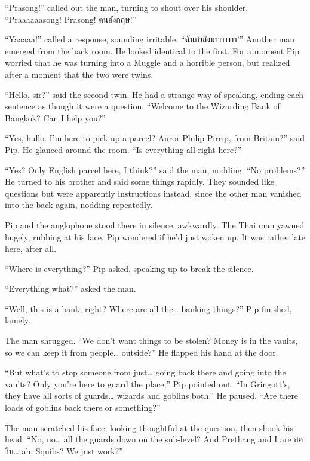``Prasong!'' called out the man, turning to shout over his shoulder.
``Praaaaaasong! Prasong! \foreignlanguage{thai}{คนอังกฤษ}!''

``Yaaaaa!'' called a response, sounding irritable.
``\foreignlanguage{thai}{ฉันกำลังมาาาาาาา}!'' Another man emerged from
the back room. He looked identical to the first. For a moment Pip
worried that he was turning into a Muggle and a horrible person, but
realized after a moment that the two were twins.

``Hello, sir?'' said the second twin. He had a strange way of speaking,
ending each sentence as though it were a question. ``Welcome to the
Wizarding Bank of Bangkok? Can I help you?''

``Yes, hullo. I'm here to pick up a parcel? Auror Philip Pirrip, from
Britain?'' said Pip. He glanced around the room. ``Is everything all
right here?''

``Yes? Only English parcel here, I think?'' said the man, nodding. ``No
problems?'' He turned to his brother and said some things rapidly. They
sounded like questions but were apparently instructions instead, since
the other man vanished into the back again, nodding repeatedly.

Pip and the anglophone stood there in silence, awkwardly. The Thai man
yawned hugely, rubbing at his face. Pip wondered if he'd just woken up.
It was rather late here, after all.

``Where is everything?'' Pip asked, speaking up to break the silence.

``Everything what?'' asked the man.

``Well, this is a bank, right? Where are all the\ldots{} banking
things?'' Pip finished, lamely.

The man shrugged. ``We don't want things to be stolen? Money is in the
vaults, so we can keep it from people\ldots{} outside?'' He flapped his
hand at the door.

``But what's to stop someone from just\ldots{} going back there and
going into the vaults? Only you're here to guard the place,'' Pip
pointed out. ``In Gringott's, they have all sorts of guards\ldots{}
wizards and goblins both.'' He paused. ``Are there loads of goblins back
there or something?''

The man scratched his face, looking thoughtful at the question, then
shook his head. ``No, no\ldots{} all the guards down on the sub-level?
And Prethang and I are \foreignlanguage{thai}{สควิบ}\ldots{} ah, Squibs?
We just work?''

